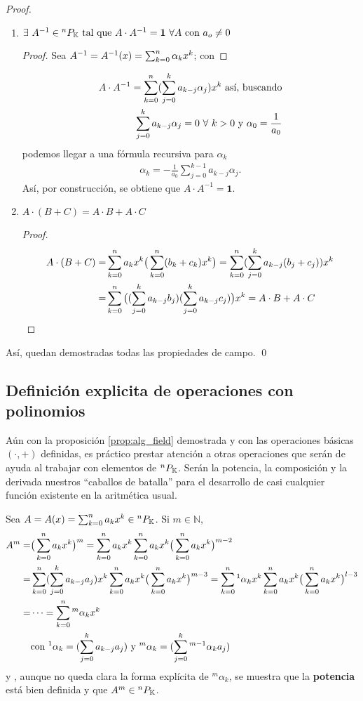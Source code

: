\begin{proof}
\begin{enumerate}
 \item $\exists \  A^{-1} \in {^{n}P_{\mathbb{K}}} \text{ tal que } A \cdot A^{-1} = \textbf{1} \ \forall A \text{ con } a_o \neq 0 $
 \begin{proof}
 Sea $A^{-1} = A^{-1}(x) = \sum_{k=0}^n \alpha_k x^k$; con 
 \end{proof}
 \begin{align*}
  A \cdot A^{-1} = \sum_{k=0}^n  (\sum_{j=0}^k a_{k-j}\alpha_j )  x^k \text{ así, buscando} \\
  \sum_{j=0}^k a_{k-j} \alpha_j = 0 \ \forall \ k>0 \text{ y }  \alpha_0 = \frac{1}{a_0}  
 \end{align*}
 podemos llegar a una fórmula recursiva para $\alpha_k$
 \begin{align*}
 \alpha_k = -\frac{1}{a_0} \sum_{j=0}^{k-1}a_{k-j}\alpha_j.
 \end{align*}
 Así, por construcción, se obtiene que $ A \cdot A^{-1} = \textbf{1} $.
 \item $ A \cdot (B+C) = A \cdot B + A \cdot C $
 \begin{proof}
  \begin{align*}
  A \cdot (B+C) =& \sum_{k=0}^n a_k x^k \big(\sum_{k=0}^n (b_k + c_k) x^k \big) = \sum_{k=0}^n (\sum_{j=0}^k a_{k-j}(b_j+c_j) ) x^k \\
  =& \sum_{k=0}^n  \big( (\sum_{j=0}^k a_{k-j}b_j ) (\sum_{j=0}^k a_{k-j}c_j ) \big)  x^k = A \cdot B + A \cdot C
  \end{align*}   
 \end{proof}
 
\end{enumerate}
Así, quedan demostradas todas las propiedades de campo. \qed
\end{proof}

\subsection{Definición explicita de operaciones con polinomios}
\label{sec:alg_functions}

Aún con la proposición \ref{prop:alg_field} demostrada y con las operaciones básicas $(\cdot,+)$ definidas, es práctico prestar atención a otras operaciones que serán de ayuda al trabajar con elementos de ${^{n}P_{\mathbb{K}}}$. Serán la potencia, la composición y la derivada nuestros ``caballos de batalla'' para el desarrollo de casi cualquier función existente en la aritmética usual.

Sea $A = A(x) = \sum_{k=0}^n a_k x^k \in {^{n}P_{\mathbb{K}}}$. Si $m \in \mathbb{N}$,
\begin{align*}
 A^m =& \big(\sum_{k=0}^n a_k x^k\big)^m = \sum_{k=0}^n a_k x^k\sum_{k=0}^n a_k x^k\big(\sum_{k=0}^n a_k x^k\big)^{m-2} \\
 =& \sum_{k=0}^n (\sum_{j=0}^k a_{k-j}a_j ) x^k\sum_{k=0}^n a_k x^k\big(\sum_{k=0}^n a_k x^k\big)^{m-3} = \sum_{k=0}^n {^1\alpha_k} x^k\sum_{k=0}^n a_k x^k\big(\sum_{k=0}^n a_k x^k\big)^{l-3} \\
 =& \cdots = \sum_{k=0}^n {^m\alpha_k} x^k \\
 &\text{con } {^1\alpha_k} = (\sum_{j=0}^k a_{k-j}a_j ) \text{ y } {^m\alpha_k} = (\sum_{j=0}^k {^{m-1}\alpha_k}a_j ) \\
\end{align*}
y , aunque no queda clara la forma explícita de ${^m\alpha_k}$, se muestra que la \textbf{potencia} está bien definida y que $A^m \in {^{n}P_{\mathbb{K}}}$.


